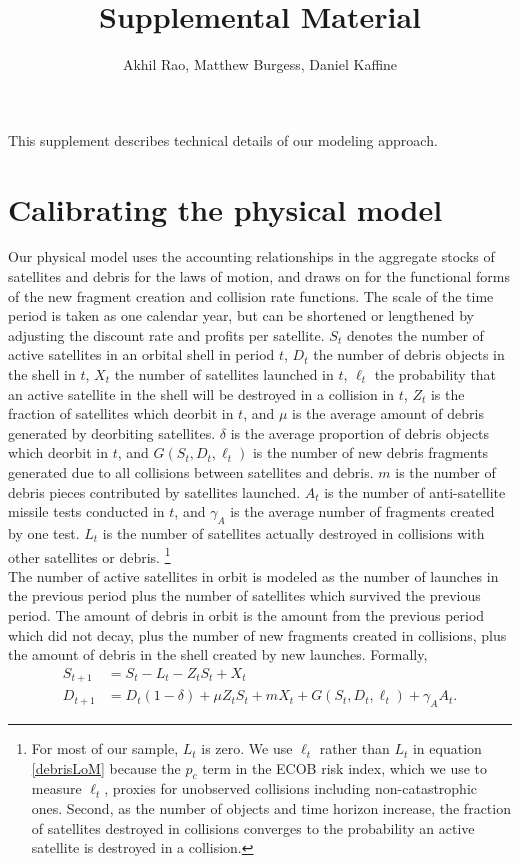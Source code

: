 \documentclass[12pt]{article}
\title{Supplemental Material}
\author{Akhil Rao, Matthew Burgess, Daniel Kaffine}
\begin{document}
	
	\maketitle

This supplement describes technical details of our modeling approach.

\section{Calibrating the physical model}	

Our physical model uses the accounting relationships in the aggregate stocks of satellites and debris for the laws of motion, and draws on \citep{bradleywein2009} for the functional forms of the new fragment creation and collision rate functions. The scale of the time period is taken as one calendar year, but can be shortened or lengthened by adjusting the discount rate and profits per satellite. $S_t$ denotes the number of active satellites in an orbital shell in period $t$, $D_t$ the number of debris objects in the shell in $t$, $X_t$ the number of satellites launched in $t$, $\ell_t$ the probability that an active satellite in the shell will be destroyed in a collision in $t$, $Z_t$ is the fraction of satellites which deorbit in $t$, and $\mu$ is the average amount of debris generated by deorbiting satellites. $\delta$ is the average proportion of debris objects which deorbit in $t$, and $G(S_t,D_t,\ell_t)$ is the number of new debris fragments generated due to all collisions between satellites and debris. $m$ is the number of debris pieces contributed by satellites launched. $A_t$ is the number of anti-satellite missile tests conducted in $t$, and $\gamma_A$ is the average number of fragments created by one test. $L_t$ is the number of satellites actually destroyed in collisions with other satellites or debris. \footnote{For most of our sample, $L_t$ is zero. We use $\ell_t$ rather than $L_t$ in equation \ref{debrisLoM} because the $p_c$ term in the ECOB risk index, which we use to measure $\ell_t$, proxies for unobserved collisions including non-catastrophic ones. Second, as the number of objects and time horizon increase, the fraction of satellites destroyed in collisions converges to the probability an active satellite is destroyed in a collision.}\\

The number of active satellites in orbit is modeled as the number of launches in the previous period plus the number of satellites which survived the previous period. The amount of debris in orbit is the amount from the previous period which did not decay, plus the number of new fragments created in collisions, plus the amount of debris in the shell created by new launches. Formally,
\begin{align}
\label{satelliteLoM}
S_{t+1} &= S_t -L_t -Z_tS_t + X_t \\
\label{debrisLoM}
D_{t+1} &= D_t(1-\delta) + \mu Z_tS_t + mX_t + G(S_t,D_t,\ell_t) + \gamma_A A_t.
\end{align}
\end{document}
